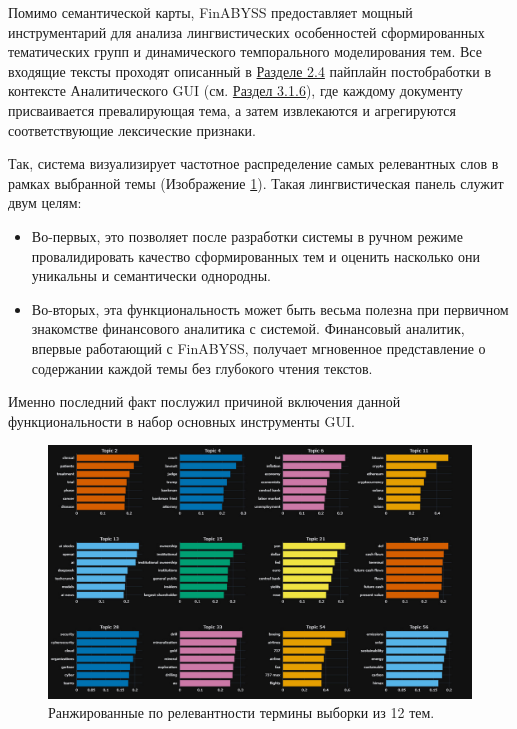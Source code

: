Помимо семантической карты, FinABYSS предоставляет мощный инструментарий для анализа лингвистических
особенностей сформированных тематических групп и динамического темпорального моделирования тем.
Все входящие тексты проходят описанный в \hyperref[sec:sys_dev]{Разделе 2.4} пайплайн постобработки в контексте Аналитического
GUI (см. \hyperref[sec:sys_dev]{Раздел 3.1.6}), где каждому документу присваивается превалирующая тема,
а затем извлекаются и агрегируются соответствующие лексические признаки.

Так, система визуализирует частотное распределение самых релевантных слов в рамках выбранной темы
(Изображение \ref{fig:topics_words_freqs}). Такая лингвистическая панель служит двум целям:

\begin{itemize}
    \item Во-первых, это позволяет после разработки системы в ручном режиме провалидировать качество сформированных
    тем и оценить насколько они уникальны и семантически однородны.
    \item Во-вторых, эта функциональность может быть весьма полезна при первичном знакомстве финансового аналитика
    с системой. Финансовый аналитик, впервые работающий с FinABYSS, получает мгновенное представление о содержании каждой темы без глубокого чтения текстов.
\end{itemize}

Именно последний факт послужил причиной включения данной функциональности в набор основных инструменты GUI.

\begin{figure}[H]
    \centering
    \includegraphics[width=1\linewidth]{img/topics_words_freqs.png}
    \caption{Ранжированные по релевантности термины выборки из 12 тем.}
    \label{fig:topics_words_freqs}
\end{figure}


